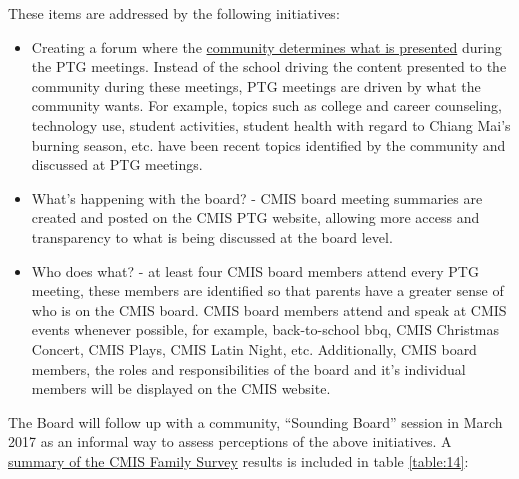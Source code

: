 These items are addressed by the following initiatives:
\begin{itemize}
\item Creating a forum where the \href{https://docs.google.com/document/d/1kiwakkg8eKdtEexCxVNx-m1CfC3VqxhukDy8WXDPGKY/edit?ts=58a2a142}{community determines what is presented} during the PTG meetings. Instead of the school driving the content presented to the community during these meetings, PTG meetings are driven by what the community wants. For example, topics such as college and career counseling, technology use, student activities, student health with regard to Chiang Mai’s burning season, etc. have been recent topics identified by the community and discussed at PTG meetings.
\item What’s happening with the board? - CMIS board meeting summaries are created and posted on the CMIS PTG website, allowing more access and transparency to what is being discussed at the board level.
\item Who does what? - at least four CMIS board members attend every PTG meeting, these members are identified so that parents have a greater sense of who is on the CMIS board. CMIS board members attend and speak at CMIS events whenever possible, for example, back-to-school bbq, CMIS Christmas Concert, CMIS Plays, CMIS Latin Night, etc. Additionally, CMIS board members, the roles and responsibilities of the board and it’s individual members will be displayed on the CMIS website.
\end{itemize}

The Board will follow up with a community, “Sounding Board” session in March 2017 as an informal way to assess perceptions of the above initiatives.  A \href{https://docs.google.com/a/cmis.ac.th/document/d/1_otvw47y3Z-1CSjXnKhgRTauVRqPl1S6nSdmsb00O2k/edit?usp=sharing}{summary of the CMIS Family Survey} results is included in table \ref{table:14}:  


